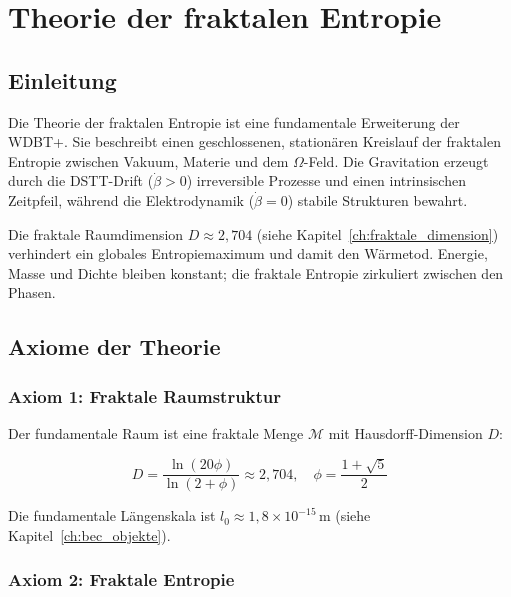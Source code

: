 
\chapter{Theorie der fraktalen Entropie}
\label{ch:fraktale_entropie}

\section{Einleitung}
\label{sec:entropie_einleitung}

Die Theorie der fraktalen Entropie ist eine fundamentale Erweiterung der WDBT+. Sie beschreibt einen geschlossenen, stationären Kreislauf der fraktalen Entropie zwischen Vakuum, Materie und dem \( \Omega \)-Feld. Die Gravitation erzeugt durch die DSTT-Drift (\( \dot{\beta} > 0 \)) irreversible Prozesse und einen intrinsischen Zeitpfeil, während die Elektrodynamik (\( \dot{\beta} = 0 \)) stabile Strukturen bewahrt.

Die fraktale Raumdimension \( D \approx 2,704 \) (siehe Kapitel~\ref{ch:fraktale_dimension}) verhindert ein globales Entropiemaximum und damit den Wärmetod. Energie, Masse und Dichte bleiben konstant; die fraktale Entropie zirkuliert zwischen den Phasen.

\section{Axiome der Theorie}
\label{sec:entropie_axiome}

\subsection{Axiom 1: Fraktale Raumstruktur}
\label{sub:entropie_axiom1}

Der fundamentale Raum ist eine fraktale Menge \( \mathcal{M} \) mit Hausdorff-Dimension \( D \):

\[
D = \frac{\ln(20\phi)}{\ln(2 + \phi)} \approx 2,704, \quad \phi = \frac{1 + \sqrt{5}}{2}
\]

Die fundamentale Längenskala ist \( l_0 \approx 1,8 \times 10^{-15} \, \text{m} \) (siehe Kapitel~\ref{ch:bec_objekte}).

\subsection{Axiom 2: Fraktale Entropie}
\label{sub:entropie_axiom2}

